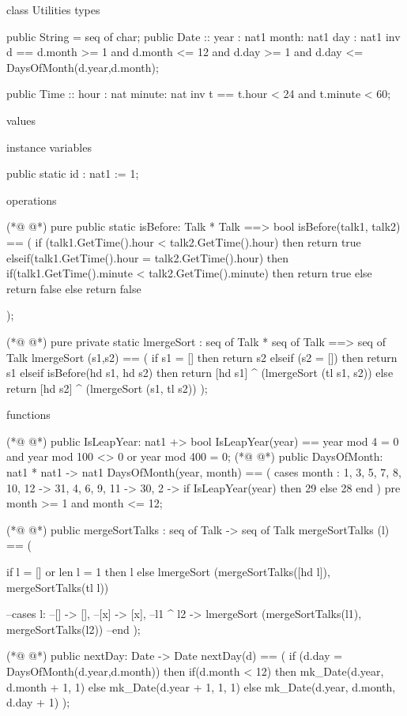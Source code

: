 \begin{vdmpp}[breaklines=true]
class Utilities
types

 public String = seq of char;
 public Date :: year : nat1
         month: nat1
          day : nat1
   inv d == d.month >= 1 and d.month <= 12 and d.day >= 1 and d.day <= DaysOfMonth(d.year,d.month);
   
 public Time :: hour : nat
         minute: nat
   inv t == t.hour < 24 and t.minute < 60;
   

   
values

instance variables

 public static id : nat1 := 1;

operations

(*@
\label{isBefore:24}
@*)
 pure public static isBefore: Talk * Talk ==> bool
  isBefore(talk1, talk2) == (
   if (talk1.GetTime().hour < talk2.GetTime().hour)
   then return true
   elseif(talk1.GetTime().hour = talk2.GetTime().hour)
   then if(talk1.GetTime().minute < talk2.GetTime().minute)
     then return true
     else return false
   else return false
  
  );
  
(*@
\label{lmergeSort:36}
@*)
 pure private static lmergeSort : seq of Talk * seq of Talk ==> seq of Talk
  lmergeSort (s1,s2) == (
   if s1 = []
   then return s2
   elseif (s2 = [])
   then return s1
   elseif 
   isBefore(hd s1, hd s2)
   then return [hd s1] ^ (lmergeSort (tl s1, s2))
   else return [hd s2] ^ (lmergeSort (s1, tl s2))
  );
   
functions

(*@
\label{IsLeapYear:50}
@*)
 public IsLeapYear: nat1 +> bool IsLeapYear(year) == year mod 4 = 0 and year mod 100 <> 0 or year mod 400 = 0;
(*@
\label{DaysOfMonth:51}
@*)
 public DaysOfMonth: nat1 * nat1 -> nat1 DaysOfMonth(year, month) == ( cases month : 1, 3, 5, 7, 8, 10, 12 -> 31, 4, 6, 9, 11 -> 30, 2 -> if IsLeapYear(year) then 29 else 28 end ) pre month >= 1 and month <= 12;
 
(*@
\label{mergeSortTalks:53}
@*)
 public mergeSortTalks : seq of Talk -> seq of Talk
  mergeSortTalks (l) == (
  
   if l = [] or len l = 1
   then l
   else lmergeSort (mergeSortTalks([hd l]), mergeSortTalks(tl l))

   --cases l:
   --[] -> [],
   --[x] -> [x],
   --l1 ^ l2 -> lmergeSort (mergeSortTalks(l1), mergeSortTalks(l2))
   --end
  );
 
(*@
\label{nextDay:67}
@*)
 public nextDay: Date -> Date
  nextDay(d) ==
  (
   if (d.day = DaysOfMonth(d.year,d.month))
   then if(d.month < 12)
      then mk_Date(d.year, d.month + 1, 1)
      else
      mk_Date(d.year + 1, 1, 1)
    else
    mk_Date(d.year, d.month, d.day + 1)
  );
  

\end{vdmpp}
